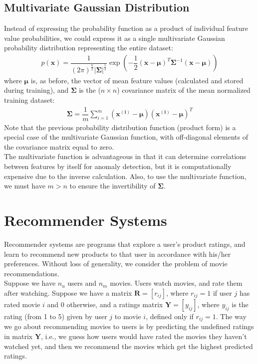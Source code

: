 \documentclass[a4paper, 12pt]{report}
\begin{document}
\section{Multivariate Gaussian Distribution}
Instead of expressing the probability function as a product of individual feature value probabilities, we could express it as a single multivariate Gaussian probability distribution representing the entire dataset:
\begin{align*}
p\left(\bm{x}\right) = \dfrac{1}{\left(2\pi\right)^{\frac{n}{2}}|\bm{\Sigma}|^{\frac{1}{2}}}\exp\left(-\dfrac{1}{2}\left(\bm{x}-\bm{\mu}\right)^T\bm{\Sigma}^{-1}\left(\bm{x}-\bm{\mu}\right)\right)
\end{align*}
where $\bm{\mu}$ is, as before, the vector of mean feature values (calculated and stored during training), and $\bm{\Sigma}$ is the ($n \times n$) covariance matrix of the mean normalized training dataset:
\begin{align*}
\bm{\Sigma} = \dfrac{1}{m}\sum_{i=1}^{m}\left(\bm{x^{\left(i\right)}} - \bm{\mu}\right)\left(\bm{x^{\left(i\right)}} - \bm{\mu}\right)^T
\end{align*}
Note that the previous probability distribution function (product form) is a special case of the multivariate Gaussian function, with off-diagonal elements of the covariance matrix equal to zero. \\
\break
The multivariate function is advantageous in that it can determine correlations between features by itself for anomaly detection, but it is computationally expensive due to the inverse calculation. Also, to use the multivariate function, we must have $m > n$ to ensure the invertibility of $\bm{\Sigma}$.

\chapter{Recommender Systems}
Recommender systems are programs that explore a user's product ratings, and learn to recommend new products to that user in accordance with his/her preferences. Without loss of generality, we consider the problem of movie recommendations.\\
\break
Suppose we have $n_u$ users and $n_m$ movies. Users watch movies, and rate them after watching. Suppose we have a matrix $\bm{R} = \left[r_{ij}\right]$, where $r_{ij} = 1$ if user $j$ has rated movie $i$ and $0$ otherwise, and a ratings matrix $\bm{Y} = \left[y_{ij}\right]$, where $y_{ij}$ is the rating (from 1 to 5) given by user $j$ to movie $i$, defined only if $r_{ij} = 1$. The way we go about recommending movies to users is by predicting the undefined ratings in matrix $\bm{Y}$, i.e., we guess how users would have rated the movies they haven't watched yet, and then we recommend the movies which get the highest predicted ratings.
\end{document}
